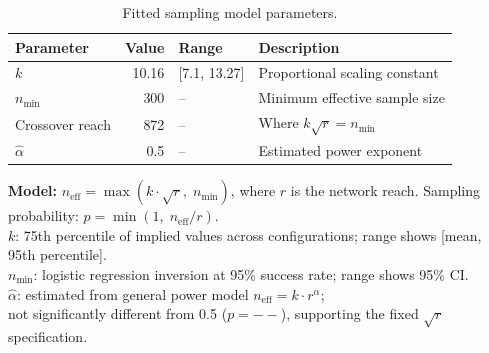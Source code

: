 \begin{table}[htbp]
\centering
\caption{Fitted sampling model parameters.}
\label{tab:parameters}
\begin{tabular}{lrll}
\toprule
\textbf{Parameter} & \textbf{Value} & \textbf{Range} & \textbf{Description} \\
\midrule
$k$ & 10.16 & [7.1, 13.27] & Proportional scaling constant \\
$n_{\min}$ & 300 & -- & Minimum effective sample size \\
Crossover reach & 872 & -- & Where $k\sqrt{r} = n_{\min}$ \\
\midrule
$\hat{\alpha}$ & 0.5 & -- & Estimated power exponent \\
\bottomrule
\end{tabular}

\vspace{0.5em}
\footnotesize
\textbf{Model:} $n_{\mathrm{eff}} = \max(k \cdot \sqrt{r},\; n_{\min})$, where $r$ is the network reach.
Sampling probability: $p = \min(1,\; n_{\mathrm{eff}} / r)$.\\
$k$: 75th percentile of implied values across configurations; range shows [mean, 95th percentile].\\
$n_{\min}$: logistic regression inversion at 95\% success rate; range shows 95\% CI.\\
$\hat{\alpha}$: estimated from general power model $n_{\mathrm{eff}} = k \cdot r^{\alpha}$; \\
not significantly different from 0.5 ($p = --$), supporting the fixed $\sqrt{r}$ specification.
\end{table}
